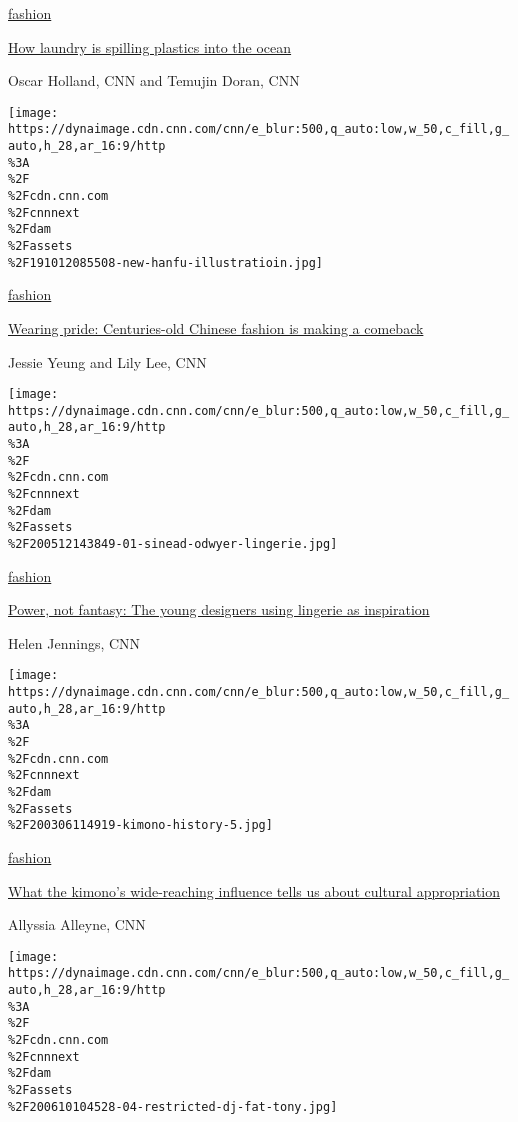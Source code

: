 \href{/style/fashion}{fashion}

\href{/style/article/laundry-plastics-microfibers-world-oceans-day/index.html}{How
laundry is spilling plastics into the ocean}

Oscar Holland, CNN and Temujin Doran, CNN

\href{/style/article/hanfu-rise-intl-hnk/index.html}{}

\texttt{[image: https://dynaimage.cdn.cnn.com/cnn/e\_blur:500,q\_auto:low,w\_50,c\_fill,g\_auto,h\_28,ar\_16:9/http\\\%3A\\\%2F\\\%2Fcdn.cnn.com\\\%2Fcnnnext\\\%2Fdam\\\%2Fassets\\\%2F191012085508-new-hanfu-illustratioin.jpg]}

\href{/style/fashion}{fashion}

\href{/style/article/hanfu-rise-intl-hnk/index.html}{Wearing pride:
Centuries-old Chinese fashion is making a comeback}

Jessie Yeung and Lily Lee, CNN

\href{/style/article/lingerie-fashion-velez-dojaka-odwyer/index.html}{}

\texttt{[image: https://dynaimage.cdn.cnn.com/cnn/e\_blur:500,q\_auto:low,w\_50,c\_fill,g\_auto,h\_28,ar\_16:9/http\\\%3A\\\%2F\\\%2Fcdn.cnn.com\\\%2Fcnnnext\\\%2Fdam\\\%2Fassets\\\%2F200512143849-01-sinead-odwyer-lingerie.jpg]}

\href{/style/fashion}{fashion}

\href{/style/article/lingerie-fashion-velez-dojaka-odwyer/index.html}{Power,
not fantasy: The young designers using lingerie as inspiration}

Helen Jennings, CNN

\href{/style/article/kimono-fashion-history-cultural-appropriation/index.html}{}

\texttt{[image: https://dynaimage.cdn.cnn.com/cnn/e\_blur:500,q\_auto:low,w\_50,c\_fill,g\_auto,h\_28,ar\_16:9/http\\\%3A\\\%2F\\\%2Fcdn.cnn.com\\\%2Fcnnnext\\\%2Fdam\\\%2Fassets\\\%2F200306114919-kimono-history-5.jpg]}

\href{/style/fashion}{fashion}

\href{/style/article/kimono-fashion-history-cultural-appropriation/index.html}{What
the kimono's wide-reaching influence tells us about cultural
appropriation}

Allyssia Alleyne, CNN

\href{/style/article/dj-fat-tony-interview/index.html}{}

\texttt{[image: https://dynaimage.cdn.cnn.com/cnn/e\_blur:500,q\_auto:low,w\_50,c\_fill,g\_auto,h\_28,ar\_16:9/http\\\%3A\\\%2F\\\%2Fcdn.cnn.com\\\%2Fcnnnext\\\%2Fdam\\\%2Fassets\\\%2F200610104528-04-restricted-dj-fat-tony.jpg]}

